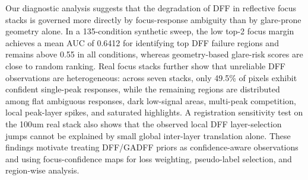\documentclass[11pt]{article}
\begin{document}
Our diagnostic analysis suggests that the degradation of DFF in reflective focus stacks is governed more directly by focus-response ambiguity than by glare-prone geometry alone. In a 135-condition synthetic sweep, the low top-2 focus margin achieves a mean AUC of 0.6412 for identifying top DFF failure regions and remains above 0.55 in all conditions, whereas geometry-based glare-risk scores are close to random ranking. Real focus stacks further show that unreliable DFF observations are heterogeneous: across seven stacks, only 49.5\% of pixels exhibit confident single-peak responses, while the remaining regions are distributed among flat ambiguous responses, dark low-signal areas, multi-peak competition, local peak-layer spikes, and saturated highlights. A registration sensitivity test on the 100um real stack also shows that the observed local DFF layer-selection jumps cannot be explained by small global inter-layer translation alone. These findings motivate treating DFF/GADFF priors as confidence-aware observations and using focus-confidence maps for loss weighting, pseudo-label selection, and region-wise analysis.
\end{document}
